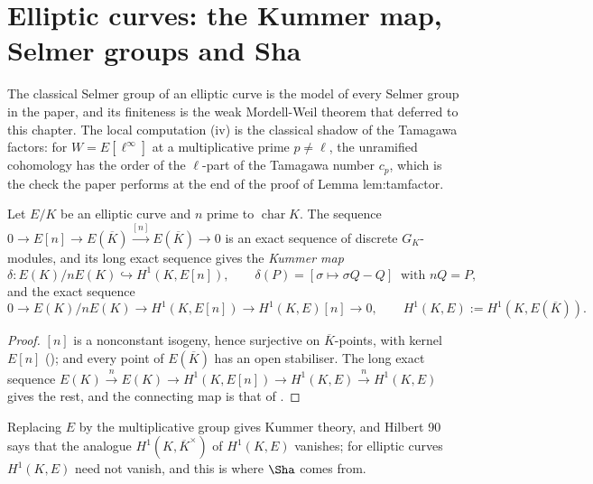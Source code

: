 \section{Elliptic curves: the Kummer map, Selmer groups and Sha}\label{sec:galcoh:selmer-ec}

The classical Selmer group of an elliptic curve is the model of every Selmer group in the paper, and its finiteness is the weak Mordell-Weil theorem that
 deferred to this chapter. The local computation (iv) is the classical shadow of the Tamagawa factors:
for $W=E[\ell^\infty]$ at a multiplicative prime $p\ne\ell$, the unramified cohomology has the order of the $\ell$-part of the Tamagawa number $c_p$, which is the check
the paper performs at the end of the proof of Lemma lem:tamfactor.

\begin{proposition}\label{prop:galcoh:ec-kummer}
Let $E/K$ be an elliptic curve and $n$ prime to $\operatorname{char}K$. The sequence $0\to E[n]\to E(\overline K)\xrightarrow{[n]}E(\overline K)\to0$ is an exact sequence of
discrete $G_K$-modules, and its long exact sequence gives the \emph{Kummer map}
\[
\delta\colon E(K)/nE(K)\hookrightarrow H^1(K,E[n]),\qquad\delta(P)=[\sigma\mapsto\sigma Q-Q]\ \text{ with }nQ=P,
\]
and the exact sequence
\[
0\to E(K)/nE(K)\to H^1(K,E[n])\to H^1(K,E)[n]\to0,\qquad H^1(K,E):=H^1(K,E(\overline K)).
\]
\end{proposition}

\begin{proof}
$[n]$ is a nonconstant isogeny, hence surjective on $\overline K$-points, with kernel $E[n]$ (); and every point of $E(\overline K)$ has an open
stabiliser. The long exact sequence $E(K)\xrightarrow{n}E(K)\to H^1(K,E[n])\to H^1(K,E)\xrightarrow{n}H^1(K,E)$ gives the rest, and the connecting map is that of
.
\end{proof}

\noindent Replacing $E$ by the multiplicative group gives Kummer theory, and Hilbert 90 says that the analogue $H^1(K,\overline K^\times)$ of $H^1(K,E)$ vanishes; for
elliptic curves $H^1(K,E)$ need not vanish, and this is where $\Sha$ comes from.

